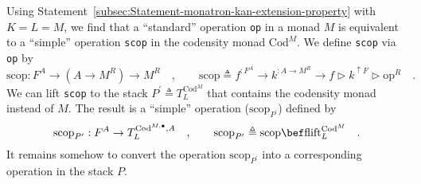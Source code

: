 Using Statement~\ref{subsec:Statement-monatron-kan-extension-property}
with $K=L=M$, we find that a \textsf{``}standard\textsf{''} operation \lstinline!op!
in a monad $M$ is equivalent to a \textsf{``}simple\textsf{''} operation \lstinline!scop!
in the codensity monad $\text{Cod}^{M}$. We define \lstinline!scop!
via \lstinline!op! by
\begin{equation}
\text{scop}:F^{A}\rightarrow(A\rightarrow M^{R})\rightarrow M^{R}\quad,\quad\quad\text{scop}\triangleq f^{:F^{A}}\rightarrow k^{:A\rightarrow M^{R}}\rightarrow f\triangleright k^{\uparrow F}\triangleright\text{op}^{R}\quad.\label{eq:monatron-scop-via-op}
\end{equation}
We can lift \lstinline!scop! to the stack $P^{\prime}\triangleq T_{L}^{\text{Cod}^{M}}$
that contains the codensity monad instead of $M$. The result is a
\textsf{``}simple\textsf{''} operation ($\text{scop}_{P^{\prime}}$) defined by
\[
\text{scop}_{P^{\prime}}:F^{A}\rightarrow T_{L}^{\text{Cod}^{M,\bullet},A}\quad,\quad\quad\text{scop}_{P^{\prime}}\triangleq\text{scop}\bef\text{flift}_{L}^{\text{Cod}^{M}}\quad.
\]
It remains somehow to convert the operation $\text{scop}_{P^{\prime}}$
into a corresponding operation in the stack $P$.


